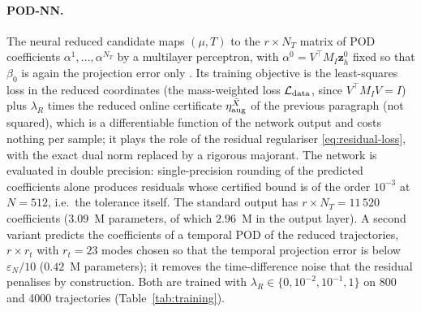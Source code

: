 \documentclass[hidelinks]{siamart251216}
\newcommand{\zz}{\mathbf z}
\begin{document}
\paragraph{POD-NN.}
The neural reduced candidate maps $(\mu,T)$ to the $r\times N_T$ matrix of POD coefficients
$\alpha^1,\dots,\alpha^{N_T}$ by a multilayer perceptron, with $\alpha^0=V^\top M_I\zz_h^0$ fixed
so that $\beta_0$ is again the projection error only
\cite{HesthavenUbbiali2018}.  Its training objective is the least-squares loss in the reduced
coordinates (the mass-weighted loss $\mathcal L_{\rm data}$, since $V^\top M_IV=I$) plus
$\lambda_R$ times the reduced online certificate $\eta^{\bar X}_{\rm aug}$ of the previous paragraph
(not squared), which is a differentiable function of the network output and costs nothing per
sample; it plays the role of the residual regulariser \eqref{eq:residual-loss}, with the exact dual
norm replaced by a rigorous majorant.  The network is evaluated in double precision: single-precision rounding of the
predicted coefficients alone produces residuals whose certified bound is of the order $10^{-3}$ at
$N=512$, i.e.\ the tolerance itself.  The standard output has $r\times N_T=11\,520$ coefficients ($3.09$~M parameters, of which $2.96$~M in
the output layer).  A second variant predicts the coefficients of a temporal POD of the reduced
trajectories, $r\times r_t$ with $r_t=23$ modes chosen so that the temporal projection error is
below $\varepsilon_N/10$ ($0.42$~M parameters); it removes the time-difference noise that the
residual penalises by construction.  Both are trained with $\lambda_R\in\{0,10^{-2},10^{-1},1\}$ on
800 and 4000 trajectories (Table~\ref{tab:training}).
\end{document}
